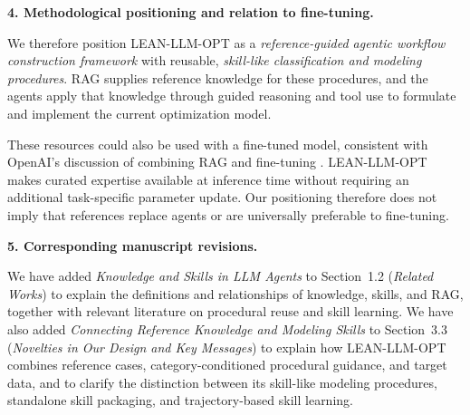 {\medskip
\noindent\textbf{4. Methodological positioning and relation to fine-tuning.}

We therefore position LEAN-LLM-OPT as a \emph{reference-guided
agentic workflow construction framework} with reusable,
\emph{skill-like classification and modeling procedures}.
RAG supplies reference knowledge for these procedures, and the
agents apply that knowledge through guided reasoning and tool
use to formulate and implement the current optimization model.

These resources could also be used with a fine-tuned model,
consistent with OpenAI's discussion of combining RAG and
fine-tuning \citep{ae1_openai2026accuracy}. LEAN-LLM-OPT makes
curated expertise available at inference time without requiring
an additional task-specific parameter update. Our positioning
therefore does not imply that references replace agents or are
universally preferable to fine-tuning.

\medskip
\noindent\textbf{5. Corresponding manuscript revisions.}

We have added \emph{Knowledge and Skills in LLM Agents} to
Section~1.2 (\emph{Related Works}) to explain the definitions
and relationships of knowledge, skills, and RAG, together with
relevant literature on procedural reuse and skill learning.
We have also added \emph{Connecting Reference Knowledge and
Modeling Skills} to Section~3.3 (\emph{Novelties in Our Design
and Key Messages}) to explain how LEAN-LLM-OPT combines reference
cases, category-conditioned procedural guidance, and target data,
and to clarify the distinction between its skill-like modeling
procedures, standalone skill packaging, and trajectory-based
skill learning.
}

